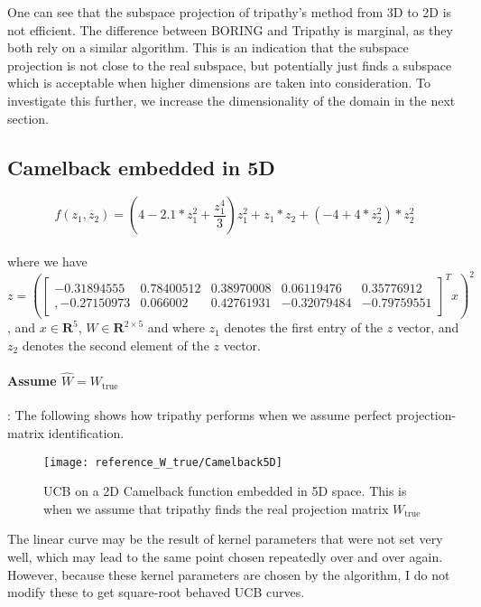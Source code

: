 One can see that the subspace projection of tripathy's method from 3D to 2D is not efficient. 
The difference between BORING and Tripathy is marginal, as they both rely on a similar algorithm.
This is an indication that the subspace projection is not close to the real subspace, but potentially just finds a subspace which is acceptable when higher dimensions are taken into consideration.
To investigate this further, we increase the dimensionality of the domain in the next section.

\subsection{Camelback embedded in 5D}

\def\WCamelback5D{
\begin{bmatrix}
     -0.31894555 & 0.78400512 & 0.38970008 & 0.06119476 & 0.35776912 \\,
     -0.27150973 & 0.066002 & 0.42761931 & -0.32079484 &-0.79759551
\end{bmatrix}}

\begin{equation}
f(z_1, z_2) = \left( 4 - 2.1 * z_1^2 + \frac{z_1^4}{3} \right)  z_1^2 + z_1 *  z_2 + \left(-4 + 4 * z_2^2 \right) * z_2^2
\end{equation} \\

where we have \\
$z = \left( \WCamelback5D^T x \right)^2 $, and $ x \in \mathbf{R}^5$, $W \in \mathbf{R}^{2 \times 5}$
and where $z_1$ denotes the first entry of the $z$ vector, and $z_2$ denotes the second element of the $z$ vector.

\paragraph{Assume $\hat{W} = W_{\text{true}}$}: The following shows how tripathy performs when we assume perfect projection-matrix identification.

\begin{figure}[H]
  \centering
      \texttt{[image: reference\_W\_true/Camelback5D]}
  \caption{UCB on a 2D Camelback function embedded in 5D space.
  This is when we assume that tripathy finds the real projection matrix $W_{\text{true}}$}
\end{figure}

The linear curve may be the result of kernel parameters that were not set very well, which may lead to the same point chosen repeatedly over and over again.
However, because these kernel parameters are chosen by the algorithm, I do not modify these to get square-root behaved UCB curves.

